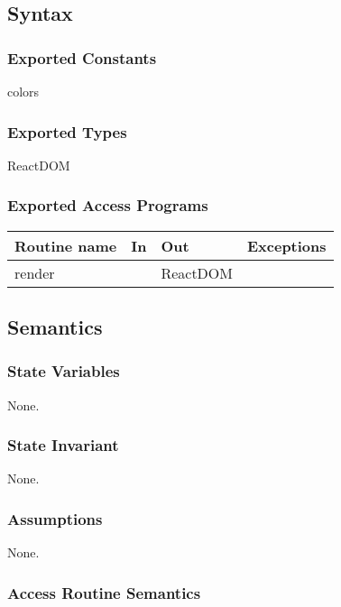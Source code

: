\documentclass[12pt, titlepage]{article}
\begin{document}
\subsection{Syntax}

\subsubsection{Exported Constants}

colors

\subsubsection{Exported Types}

ReactDOM

\subsubsection{Exported Access Programs}

\begin{tabular}{| l | l | l | l |}
  \hline
  \textbf{Routine name} & \textbf{In} & \textbf{Out} & \textbf{Exceptions}\\
  \hline
  render & ~ & ReactDOM & ~\\
  \hline
\end{tabular}

\subsection{Semantics}

\subsubsection{State Variables}

None.

\subsubsection{State Invariant}

None.

\subsubsection{Assumptions}

None.

\subsubsection{Access Routine Semantics}
\end{document}
